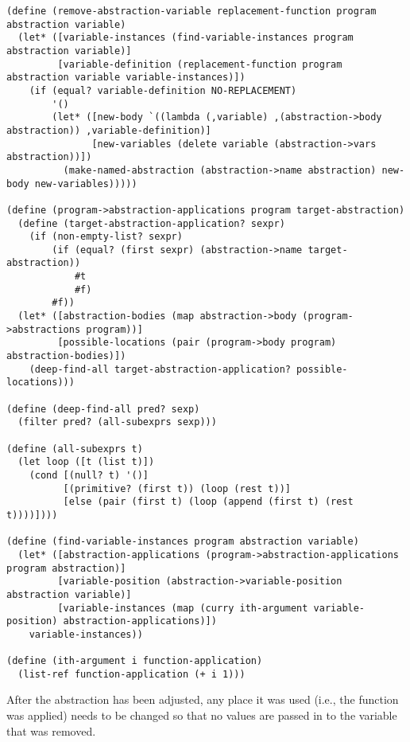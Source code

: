 \documentclass[a4paper,10pt]{article}
\begin{document}
\begin{lstlisting}[frame=trbl]
(define (remove-abstraction-variable replacement-function program abstraction variable)
  (let* ([variable-instances (find-variable-instances program abstraction variable)]
         [variable-definition (replacement-function program abstraction variable variable-instances)])
    (if (equal? variable-definition NO-REPLACEMENT)
        '()
        (let* ([new-body `((lambda (,variable) ,(abstraction->body abstraction)) ,variable-definition)]
               [new-variables (delete variable (abstraction->vars abstraction))])
          (make-named-abstraction (abstraction->name abstraction) new-body new-variables)))))

(define (program->abstraction-applications program target-abstraction)
  (define (target-abstraction-application? sexpr)
    (if (non-empty-list? sexpr)
        (if (equal? (first sexpr) (abstraction->name target-abstraction))
            #t
            #f)
        #f))
  (let* ([abstraction-bodies (map abstraction->body (program->abstractions program))]
         [possible-locations (pair (program->body program) abstraction-bodies)])
    (deep-find-all target-abstraction-application? possible-locations)))

(define (deep-find-all pred? sexp)
  (filter pred? (all-subexprs sexp)))

(define (all-subexprs t)
  (let loop ([t (list t)])
    (cond [(null? t) '()]
          [(primitive? (first t)) (loop (rest t))]
          [else (pair (first t) (loop (append (first t) (rest t))))])))

(define (find-variable-instances program abstraction variable)
  (let* ([abstraction-applications (program->abstraction-applications program abstraction)]
         [variable-position (abstraction->variable-position abstraction variable)]
         [variable-instances (map (curry ith-argument variable-position) abstraction-applications)])
    variable-instances))

(define (ith-argument i function-application)
  (list-ref function-application (+ i 1)))

\end{lstlisting}
After the abstraction has been adjusted, any place it was used (i.e., the function was applied) needs to be changed so that no values are passed in to the variable that was removed.
\end{document}
